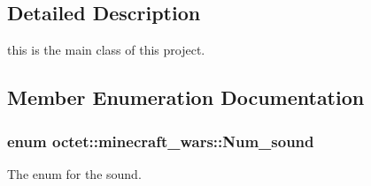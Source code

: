 \subsection{Detailed Description}
this is the main class of this project. 

\subsection{Member Enumeration Documentation}
\hypertarget{classoctet_1_1minecraft__wars_ac30cfc7ec58748224e1109e398522462}{
\subsubsection[{Num\+\_\+sound}]{\setlength{\rightskip}{0pt plus 5cm}enum {\bf octet\+::minecraft\+\_\+wars\+::\+Num\+\_\+sound}\hspace{0.3cm}{\ttfamily [private]}}}\label{classoctet_1_1minecraft__wars_ac30cfc7ec58748224e1109e398522462}


The enum for the sound. 

